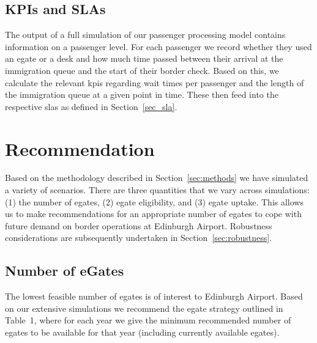 \documentclass[10pt]{article}
\begin{document}
\subsection{KPIs and SLAs}
The output of a full simulation of our passenger processing model contains information on a passenger level. For each passenger we record whether they used an \gls{egate} or a desk and how much time passed between their arrival at the immigration queue and the start of their border check. Based on this, we calculate the relevant \glspl{kpi} regarding wait times per passenger and the length of the immigration queue at a given point in time. These then feed into the respective \glspl{sla} as defined in Section~\ref{sec_sla}.

\section{Recommendation}

Based on the methodology described in Section~\ref{sec:methods} we have simulated a variety of scenarios. There are three quantities that we vary across simulations: (1) the number of \glspl{egate}, (2) \gls{egate} eligibility, and (3) \gls{egate} uptake. This allows us to make recommendations for an appropriate number of \glspl{egate} to cope with future demand on border operations at Edinburgh Airport. Robustness considerations are subsequently undertaken in Section~\ref{sec:robustness}. 

\subsection{Number of eGates} \label{sec:rec_num_egates}

The lowest feasible number of \glspl{egate} is of interest to Edinburgh Airport. Based on our extensive simulations we recommend the \gls{egate} strategy outlined in Table~1, where for each year we give the minimum recommended number of \glspl{egate} to be available for that year (including currently available \glspl{egate}). 

\vspace{2mm}
\begin{center}

\end{center}
\vspace{1mm}
% 
\end{document}
